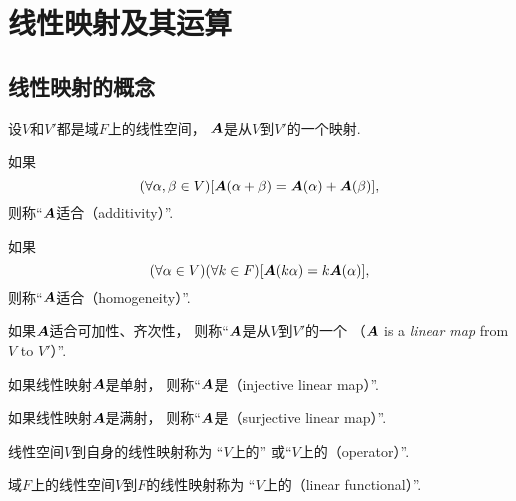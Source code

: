 \section{线性映射及其运算}
\subsection{线性映射的概念}
\begin{definition}\label{definition:线性映射.线性映射}
设\(V\)和\(V'\)都是域\(F\)上的线性空间，
\(\boldsymbol{A}\)是从\(V\)到\(V'\)的一个映射.

如果\begin{equation*}
	(\forall\alpha,\beta\in V)
	[\boldsymbol{A}(\alpha+\beta)=\boldsymbol{A}(\alpha)+\boldsymbol{A}(\beta)],
\end{equation*}
则称“\(\boldsymbol{A}\)适合（additivity）”.

如果\begin{equation*}
	(\forall\alpha\in V)
	(\forall k\in F)
	[\boldsymbol{A}(k\alpha)=k\boldsymbol{A}(\alpha)],
\end{equation*}
则称“\(\boldsymbol{A}\)适合（homogeneity）”.

如果\(\boldsymbol{A}\)适合可加性、齐次性，
则称“\(\boldsymbol{A}\)是从\(V\)到\(V'\)的一个%
（\(\boldsymbol{A}\) is a \emph{linear map} from \(V\) to \(V'\)）”.
\end{definition}

\begin{definition}
如果线性映射\(\boldsymbol{A}\)是单射，
则称“\(\boldsymbol{A}\)是（injective linear map）”.
\end{definition}

\begin{definition}
如果线性映射\(\boldsymbol{A}\)是满射，
则称“\(\boldsymbol{A}\)是（surjective linear map）”.
\end{definition}

\begin{definition}
线性空间\(V\)到自身的线性映射称为
“\(V\)上的”
或“\(V\)上的（operator）”.
\end{definition}

\begin{definition}\label{definition:线性映射.线性函数}
域\(F\)上的线性空间\(V\)到\(F\)的线性映射称为
“\(V\)上的（linear functional）”.
\end{definition}

